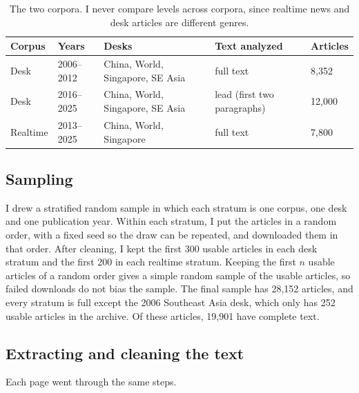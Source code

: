\documentclass[11pt]{article}
\begin{document}
\begin{table}[tbp]
\centering
\small
\begin{tabular}{@{}lllll@{}}
\toprule
Corpus & Years & Desks & Text analyzed & Articles \\
\midrule
Desk & 2006--2012 & China, World, Singapore, SE Asia & full text & 8,352 \\
Desk & 2016--2025 & China, World, Singapore, SE Asia & lead (first two paragraphs) & 12,000 \\
Realtime & 2013--2025 & China, World, Singapore & full text & 7,800 \\
\bottomrule
\end{tabular}
\caption{The two corpora. I never compare levels across corpora, since realtime news and desk articles are different genres.}
\label{tab:corpora}
\end{table}

\subsection{Sampling}

I drew a stratified random sample in which each stratum is one corpus, one desk and one publication year. Within each stratum, I put the articles in a random order, with a fixed seed so the draw can be repeated, and downloaded them in that order. After cleaning, I kept the first 300 usable articles in each desk stratum and the first 200 in each realtime stratum. Keeping the first $n$ usable articles of a random order gives a simple random sample of the usable articles, so failed downloads do not bias the sample. The final sample has 28,152 articles, and every stratum is full except the 2006 Southeast Asia desk, which only has 252 usable articles in the archive. Of these articles, 19,901 have complete text.

\subsection{Extracting and cleaning the text}

Each page went through the same steps.
\end{document}
